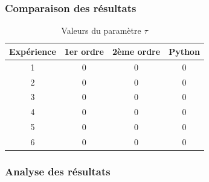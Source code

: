 \documentclass{beamer}
\begin{document}
\begin{frame}
\frametitle{Comparaison des résultats}

\begin{table}[htdp]
\begin{center}\begin{tabular}{|c|c|c|c|}
\hline
Expérience & 1er ordre & 2ème ordre & Python \\
\hline
1 & 0 & 0 & 0 \\
2 & 0 & 0 & 0 \\
3 & 0 & 0 & 0 \\
4 & 0 & 0 & 0 \\
5 & 0 & 0 & 0 \\
6 & 0 & 0 & 0\\
\hline
\end{tabular} 
\caption{Valeurs du paramètre $\tau$}
\end{center}
\label{defaulttable}
\end{table}

\end{frame}





\begin{frame}
\frametitle{Analyse des résultats}

\end{frame}
\end{document}
